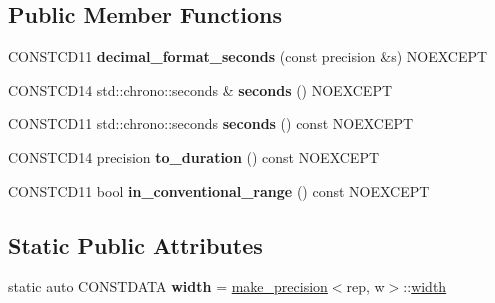 \subsection*{Public Member Functions}
\begin{DoxyCompactItemize}
\item 
\mbox{\label{classdate_1_1detail_1_1decimal__format__seconds_3_01_duration_00_010_01_4_a5cf1e39cedc1e2ba7577cd441f33bb8d}} 
C\+O\+N\+S\+T\+C\+D11 {\bfseries decimal\+\_\+format\+\_\+seconds} (const precision \&s) N\+O\+E\+X\+C\+E\+PT
\item 
\mbox{\label{classdate_1_1detail_1_1decimal__format__seconds_3_01_duration_00_010_01_4_a9ed55bcbe3f5d3d4ff7e61aeca69df3b}} 
C\+O\+N\+S\+T\+C\+D14 std\+::chrono\+::seconds \& {\bfseries seconds} () N\+O\+E\+X\+C\+E\+PT
\item 
\mbox{\label{classdate_1_1detail_1_1decimal__format__seconds_3_01_duration_00_010_01_4_af1935871a72d124c8a0e5de41fda11a5}} 
C\+O\+N\+S\+T\+C\+D11 std\+::chrono\+::seconds {\bfseries seconds} () const N\+O\+E\+X\+C\+E\+PT
\item 
\mbox{\label{classdate_1_1detail_1_1decimal__format__seconds_3_01_duration_00_010_01_4_a4e5f3be269c8f018151a9fa41da3134a}} 
C\+O\+N\+S\+T\+C\+D14 precision {\bfseries to\+\_\+duration} () const N\+O\+E\+X\+C\+E\+PT
\item 
\mbox{\label{classdate_1_1detail_1_1decimal__format__seconds_3_01_duration_00_010_01_4_a7ebc8fef32e55ec4ed899e6ee4eab2b7}} 
C\+O\+N\+S\+T\+C\+D11 bool {\bfseries in\+\_\+conventional\+\_\+range} () const N\+O\+E\+X\+C\+E\+PT
\end{DoxyCompactItemize}
\subsection*{Static Public Attributes}
\begin{DoxyCompactItemize}
\item 
\mbox{\label{classdate_1_1detail_1_1decimal__format__seconds_3_01_duration_00_010_01_4_a7ccac22168f44ff462d785414bf072fb}} 
static auto C\+O\+N\+S\+T\+D\+A\+TA {\bfseries width} = \mbox{\hyperlink{structdate_1_1detail_1_1make__precision}{make\+\_\+precision}}$<$rep, w$>$\+::\mbox{\hyperlink{structdate_1_1detail_1_1width}{width}}
\end{DoxyCompactItemize}
